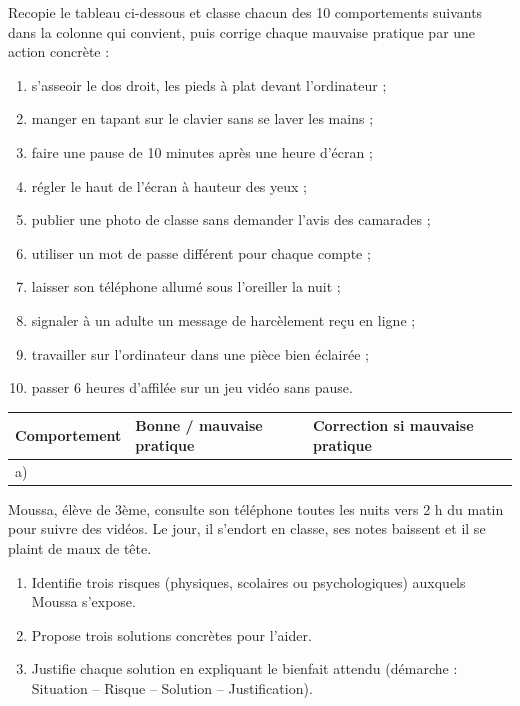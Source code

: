 \documentclass[11pt]{article}
\begin{document}
\begin{exercice}
Recopie le tableau ci-dessous et classe chacun des 10 comportements suivants dans la colonne qui convient, puis corrige chaque mauvaise pratique par une action concrète :
\begin{enumerate}
\item[a)] s'asseoir le dos droit, les pieds à plat devant l'ordinateur ;
\item[b)] manger en tapant sur le clavier sans se laver les mains ;
\item[c)] faire une pause de 10 minutes après une heure d'écran ;
\item[d)] régler le haut de l'écran à hauteur des yeux ;
\item[e)] publier une photo de classe sans demander l'avis des camarades ;
\item[f)] utiliser un mot de passe différent pour chaque compte ;
\item[g)] laisser son téléphone allumé sous l'oreiller la nuit ;
\item[h)] signaler à un adulte un message de harcèlement reçu en ligne ;
\item[i)] travailler sur l'ordinateur dans une pièce bien éclairée ;
\item[j)] passer 6 heures d'affilée sur un jeu vidéo sans pause.
\end{enumerate}
\begin{center}
\begin{tabularx}{\linewidth}{|X|l|X|}
\hline
\rowcolor{popblueL} \textbf{Comportement} & \textbf{Bonne / mauvaise pratique} & \textbf{Correction si mauvaise pratique} \\
\hline
a) & & \\
\hline
\end{tabularx}
\end{center}
\end{exercice}

\begin{exercice}
Moussa, élève de 3ème, consulte son téléphone toutes les nuits vers 2 h du matin pour suivre des vidéos. Le jour, il s'endort en classe, ses notes baissent et il se plaint de maux de tête.
\begin{enumerate}
\item Identifie trois risques (physiques, scolaires ou psychologiques) auxquels Moussa s'expose.
\item Propose trois solutions concrètes pour l'aider.
\item Justifie chaque solution en expliquant le bienfait attendu (démarche : Situation -- Risque -- Solution -- Justification).
\end{enumerate}
\end{exercice}
\end{document}

